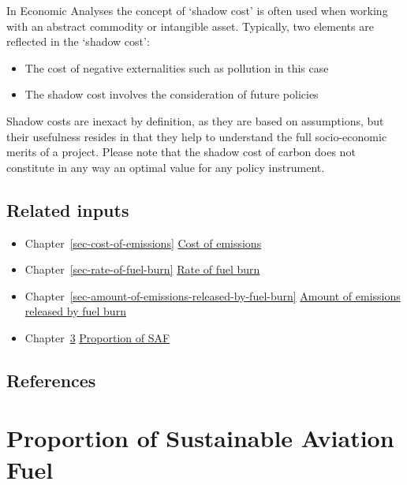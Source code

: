 \documentclass[
  11pt,
  a4paper,
]{book}
\providecommand{\tightlist}{%
  \setlength{\itemsep}{0pt}\setlength{\parskip}{0pt}}\usepackage{longtable,booktabs,array}
\begin{document}
In Economic Analyses the concept of `shadow cost' is often used when
working with an abstract commodity or intangible asset. Typically, two
elements are reflected in the `shadow cost':

\begin{itemize}
\tightlist
\item
  The cost of negative externalities such as pollution in this case
\item
  The shadow cost involves the consideration of future policies
\end{itemize}

Shadow costs are inexact by definition, as they are based on
assumptions, but their usefulness resides in that they help to
understand the full socio-economic merits of a project. Please note that
the shadow cost of carbon does not constitute in any way an optimal
value for any policy instrument.

\hypertarget{related-inputs-7}{%
\section{Related inputs}\label{related-inputs-7}}

\begin{itemize}
\tightlist
\item
  Chapter~\ref{sec-cost-of-emissions}
  \protect\hyperlink{sec-cost-of-emissions}{Cost of emissions}
\item
  Chapter~\ref{sec-rate-of-fuel-burn}
  \protect\hyperlink{sec-rate-of-fuel-burn}{Rate of fuel burn}
\item
  Chapter~\ref{sec-amount-of-emissions-released-by-fuel-burn}
  \protect\hyperlink{sec-amount-of-emissions-released-by-fuel-burn}{Amount
  of emissions released by fuel burn}
\item
  Chapter~\ref{sec-proportion-of-saf}
  \protect\hyperlink{sec-proportion-of-saf}{Proportion of SAF}
\end{itemize}

\hypertarget{references-8}{%
\section{References}\label{references-8}}

\hypertarget{sec-proportion-of-saf}{%
\chapter{Proportion of Sustainable Aviation
Fuel}\label{sec-proportion-of-saf}}
\end{document}
